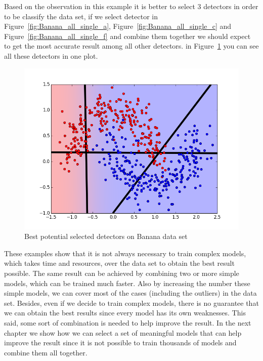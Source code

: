 Based on the observation in this example it is better to select 3 detectors in order to be classify the data set, if we select detector in Figure~\ref{fig:Banana_all_single_a}, Figure~\ref{fig:Banana_all_single_c} and Figure~\ref{fig:Banana_all_single_f}  and combine them together we should expect to get the most accurate result among all other detectors. in Figure~\ref{fig::combined_banana_roc} you can see all these detectors in one plot.


\begin{figure}[H]
\centering
\includegraphics[scale=0.6]{figs/Banana/9999999-combined_selected_before_combination}
\caption{Best potential selected detectors on Banana data set}
\label{fig::combined_banana_roc}
\end{figure}

These examples show that it is not always necessary to train complex models, which takes time and resources, over the data set to obtain the best result possible. The same result can be achieved by combining two or more simple models, which can be trained much faster. Also by increasing the number these simple models, we can cover most of the cases (including the outliers) in the data set. Besides, even if we decide to train complex models, there is no guarantee that we can obtain the best results since every model has its own weaknesses. This said, some sort of combination is needed to help improve the result. In the next chapter we show how we can select a set of meaningful models that can help improve the result since it is not possible to train thousands of models and combine them all together. 

